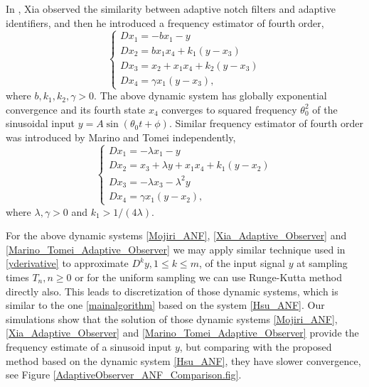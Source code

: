 \documentclass{UCF_ETD}
\begin{document}
In \cite{xia02}, Xia  observed the similarity between adaptive notch filters and adaptive identifiers,
and then
he introduced a frequency estimator of fourth order,
\begin{equation}\label{Xia_Adaptive_Observer}
\left\{\begin{array} {l}
D{x_1} = -bx_1 -y  \\
D{x_2} = bx_1x_4 + k_1(y-x_3)  \\
D{x_3} = x_2+ x_1x_4 + k_2(y-x_3)  \\
D{x_4} = \gamma x_1(y -x_3),
\end{array}
\right.
\end{equation}
where $b, k_1, k_2, \gamma>0$.
The above dynamic system  has globally exponential convergence and its fourth state $x_4$
converges to squared frequency $\theta_0^2$ of the  sinusoidal input
$y = A\sin(\theta_0 t + \phi)$.
Similar frequency estimator of fourth order was introduced by
Marino and Tomei \cite{marino02} independently,
\begin{equation}\label{Marino_Tomei_Adaptive_Observer}
\left\{\begin{array}{l}
D{x_1} = - \lambda x_1 -y  \\
D{x_2} = x_3+ \lambda y+ x_1x_4 + k_1(y -x_2)   \\
D{x_3} = -\lambda x_3 - {\lambda}^2 y   \\
D{x_4} = \gamma x_1(y -x_2),
\end{array}
\right.\end{equation}
where $ \lambda, \gamma>0$ and $k_1 > 1/(4\lambda)$.


For the above dynamic systems
 \eqref{Mojiri_ANF}, \eqref{Xia_Adaptive_Observer}  and
  \eqref{Marino_Tomei_Adaptive_Observer}
 we may apply similar technique used in \eqref{yderivative}
to approximate
 $D^ky, 1\le k\le m$, of the input signal $y$
 at sampling times $T_n, n\ge 0$ or for the uniform sampling we can use Runge-Kutta method directly also. This leads to
 discretization of those dynamic systems, which is similar to
 the one \eqref{mainalgorithm} based on the system \eqref{Hsu_ANF}.
Our simulations show that the solution
of those dynamic systems
 \eqref{Mojiri_ANF}, \eqref{Xia_Adaptive_Observer}  and
  \eqref{Marino_Tomei_Adaptive_Observer}
provide the frequency estimate of a sinusoid input $y$, but comparing with
the proposed method based on the dynamic system \eqref{Hsu_ANF}, they have slower convergence,
see Figure \ref{AdaptiveObserver_ANF_Comparison.fig}.\\
\end{document}
